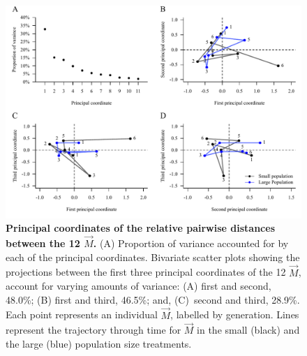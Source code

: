 \begin{figure}[htp]
\includegraphics[width=1\textwidth]{Chp3_Multi/M_in_H_MittDist.pdf}
\vspace*{-0.4cm}
\caption[Principal coordinates of the relative pairwise distances between the 12 $\vec{M}$.]{\textbf{Principal coordinates of the relative pairwise distances between the 12 $\vec{M}$.} (A) Proportion of variance accounted for by each of the principal coordinates. Bivariate scatter plots showing the projections between the first three principal coordinates of the 12 $\vec{M}$, account for varying amounts of variance: (A) first and second, 48.0\%; (B) first and third, 46.5\%; and, (C)~second and third, 28.9\%. Each point represents an individual $\vec{M}$, labelled by generation. Lines represent the trajectory through time for $\vec{M}$ in the small (black) and the large (blue) population size treatments.}
\label{fig:multi_Mitteroecker}
\end{figure}
\FloatBarrier

 

